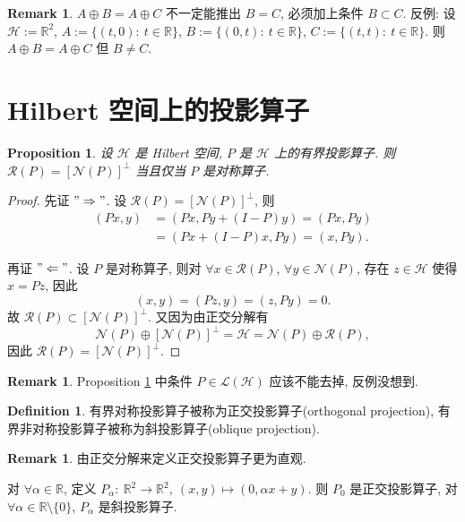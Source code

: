 \documentclass[a4paper,11pt]{article}
\newtheorem{proposition}[theorem]{Proposition}
\theoremstyle{definition}
\newtheorem{remark}[theorem]{Remark}
\newtheorem{definition}[theorem]{Definition}
\begin{document}
\begin{remark}
    $ A \oplus B = A \oplus C $ 不一定能推出 $ B = C $, 必须加上条件 $ B \subset C $.
    反例: 设 $ \mathcal{H} := \mathbb{R}^2 $, 
    $ A := \{ (t, 0) :\ t \in \mathbb{R} \} $,
    $ B := \{ (0, t) :\ t \in \mathbb{R} \} $,
    $ C := \{ (t, t) :\ t \in \mathbb{R} \} $.
    则 $ A \oplus B = A \oplus C $ 但 $ B \neq C $.
\end{remark}

\section{Hilbert 空间上的投影算子}

\begin{proposition} \label{5}
    设 $ \mathcal{H} $ 是 Hilbert 空间, $ P $ 是 $ \mathcal{H} $ 上的有界投影算子. 
    则 $ \mathcal{R}(P) = [\mathcal{N}(P)]^\bot $ 当且仅当 $ P $ 是对称算子.
\end{proposition}

\begin{proof}
    先证 $ "\Rightarrow" $. 设 $ \mathcal{R}(P) = [\mathcal{N}(P)]^\bot $, 则
    \begin{align*}
        (P x, y) &= (Px, Py + (I - P)y) 
                 = (Px, Py)  \\
                 &= (Px + (I - P)x, Py)
                 = (x, Py).
    \end{align*}
    
    再证 $ "\Leftarrow" $. 设 $ P $ 是对称算子, 则对 $ \forall x \in \mathcal{R}(P) $, $ \forall y \in \mathcal{N}(P) $,
    存在 $ z \in \mathcal{H} $ 使得 $ x = Pz $, 因此
    $$
        (x, y) = (Pz, y) = (z, Py) = 0.
    $$
    故 $ \mathcal{R}(P) \subset [\mathcal{N}(P)]^\bot $.
    又因为由正交分解有
    $$
        \mathcal{N}(P) \oplus [\mathcal{N}(P)]^\bot = \mathcal{H} = \mathcal{N}(P) \oplus \mathcal{R}(P),
    $$
    因此 $ \mathcal{R}(P) = [\mathcal{N}(P)]^\bot $.
\end{proof}

\begin{remark}
    Proposition \ref{5} 中条件 $ P \in \mathscr{L}(\mathcal{H}) $ 应该不能去掉, 反例没想到.
\end{remark}

\begin{definition}
    有界对称投影算子被称为正交投影算子(orthogonal projection),
    有界非对称投影算子被称为斜投影算子(oblique projection).
\end{definition}

\begin{remark}
    由正交分解来定义正交投影算子更为直观.

    对 $ \forall \alpha \in \mathbb{R} $,
    定义 $ P_\alpha :\ \mathbb{R}^2 \to \mathbb{R}^2,\ (x, y) \mapsto (0, \alpha x + y) $.
    则 $ P_0 $ 是正交投影算子, 对 $ \forall \alpha \in \mathbb{R} \setminus \{0\} $, $ P_\alpha $ 是斜投影算子.
\end{remark}
\end{document}
